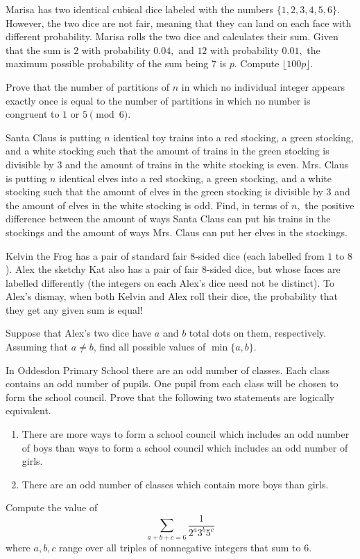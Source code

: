 \documentclass[mast]{lucky}
\begin{document}
\begin{prob}{4}
Marisa has two identical cubical dice labeled with the numbers $\{1,2,3,4,5,6\}.$ However, the two dice are not fair, meaning that they can land on each face with different probability. Marisa rolls the two dice and calculates their sum. Given that the sum is $2$ with probability $0.04,$ and $12$ with probability $0.01,$ the maximum possible probability of the sum being $7$ is $p.$ Compute $\lfloor 100p\rfloor.$
\end{prob}

\begin{req}[]{6}
Prove that the number of partitions of $n$ in which no individual integer appears exactly once is equal to the number of partitions in which no number is congruent to $1$ or $5\pmod{6}.$
\end{req}
    
\begin{prob}[ART 2020/4]{6}
Santa Claus is putting $n$ identical toy trains into a red stocking, a green stocking, and a white stocking such that the amount of trains in the green stocking is divisible by $3$ and the amount of trains in the white stocking is even. Mrs. Claus is putting $n$ identical elves into a red stocking, a green stocking, and a white stocking such that the amount of elves in the green stocking is divisible by $3$ and the amount of elves in the white stocking is odd. Find, in terms of $n,$ the positive difference between the amount of ways Santa Claus can put his trains in the stockings and the amount of ways Mrs. Claus can put her elves in the stockings.
\end{prob}
    
\begin{prob}[HMMT 2016]{9}
Kelvin the Frog has a pair of standard fair $8$-sided dice (each labelled from $1$ to $8$). Alex the sketchy Kat also has a pair of fair $8$-sided dice, but whose faces are labelled differently (the integers on each Alex's dice need not be distinct). To Alex's dismay, when both Kelvin and Alex roll their dice, the probability that they get any given sum is equal!

Suppose that Alex's two dice have $a$ and $b$ total dots on them, respectively. Assuming that $a \neq b$, find all possible values of $\min \{a,b\}$.
\end{prob}

\begin{req}{9}
In Oddesdon Primary School there are an odd number of classes. Each class contains an odd number of pupils. One pupil from each class will be chosen to form the school council. Prove that the following two statements are logically equivalent.
\begin{enumerate}
\item There are more ways to form a school council which includes an odd number of boys than ways to form a school council which includes an odd number of girls.

\item There are an odd number of classes which contain more boys than girls.
\end{enumerate}
\end{req}

\begin{prob}[NYCMT 2020]{13}
Compute the value of
\[\sum_{a+b+c=6}\frac{1}{2^a3^b5^c}\]
where $a,b,c$ range over all triples of nonnegative integers that sum to $6.$
\end{prob}
\end{document}
